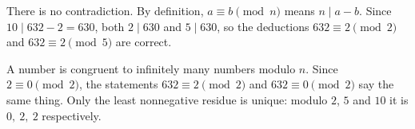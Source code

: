 There is no contradiction. By definition, $a\equiv b\pmod n$ means $n\mid a-b$. Since $10\mid632-2=630$, both $2\mid630$ and $5\mid630$, so the deductions $632\equiv2\pmod2$ and $632\equiv2\pmod5$ are correct.

A number is congruent to infinitely many numbers modulo $n$. Since $2\equiv0\pmod2$, the statements $632\equiv2\pmod2$ and $632\equiv0\pmod2$ say the same thing. Only the least nonnegative residue is unique: modulo $2$, $5$ and $10$ it is $\boxed{0,\ 2,\ 2}$ respectively.
